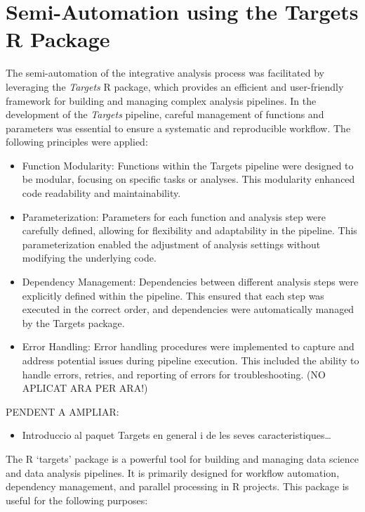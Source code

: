 \documentclass[a4paper, nobind]{templates/ociamthesis}
\providecommand{\tightlist}{%
  \setlength{\itemsep}{0pt}\setlength{\parskip}{0pt}}
\begin{document}
\hypertarget{semi-automation-using-the-targets-r-package}{%
\section{Semi-Automation using the Targets R Package}\label{semi-automation-using-the-targets-r-package}}

The semi-automation of the integrative analysis process was facilitated by leveraging the \emph{Targets} R package, which provides an efficient and user-friendly framework for building and managing complex analysis pipelines. In the development of the \emph{Targets} pipeline, careful management of functions and parameters was essential to ensure a systematic and reproducible workflow. The following principles were applied:

\begin{itemize}
\item
  Function Modularity: Functions within the Targets pipeline were designed to be modular, focusing on specific tasks or analyses. This modularity enhanced code readability and maintainability.
\item
  Parameterization: Parameters for each function and analysis step were carefully defined, allowing for flexibility and adaptability in the pipeline. This parameterization enabled the adjustment of analysis settings without modifying the underlying code.
\item
  Dependency Management: Dependencies between different analysis steps were explicitly defined within the pipeline. This ensured that each step was executed in the correct order, and dependencies were automatically managed by the Targets package.
\item
  Error Handling: Error handling procedures were implemented to capture and address potential issues during pipeline execution. This included the ability to handle errors, retries, and reporting of errors for troubleshooting. (NO APLICAT ARA PER ARA!)
\end{itemize}

PENDENT A AMPLIAR:

\begin{itemize}
\tightlist
\item
  Introduccio al paquet Targets en general i de les seves caracteristiques\ldots{}
\end{itemize}

The R `targets' package is a powerful tool for building and managing data science and data analysis pipelines. It is primarily designed for workflow automation, dependency management, and parallel processing in R projects. This package is useful for the following purposes:
\end{document}

